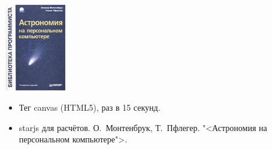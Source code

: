 \begin{frame}
  \begin{floatingfigure}[rh]{0.2\textwidth}
    \includegraphics[width=0.2\textwidth]{astro.jpg}
  \end{floatingfigure}
  
  \begin{itemize}
  \item Тег canvas (HTML5), раз в 15 секунд.
  \item starjs для расчётов.  О.~Монтенбрук, Т.~Пфлегер. "<Астрономия
    на персональном компьютере">.
  \end{itemize}
\end{frame}
